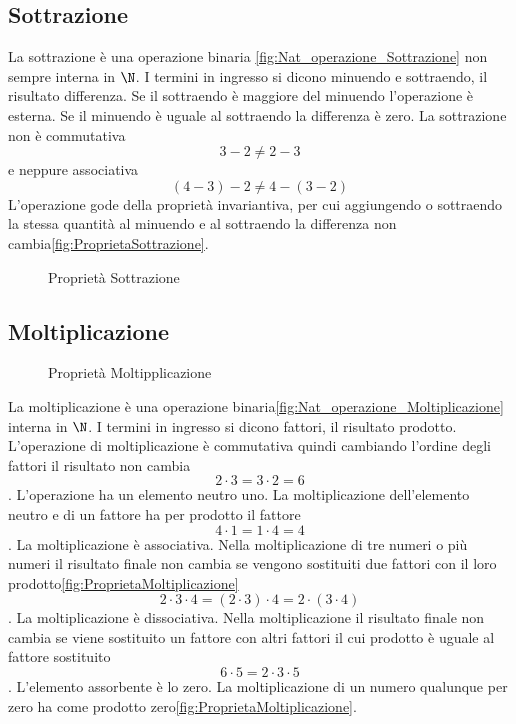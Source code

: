 \subsection{Sottrazione}
\label{sec:NumerinatDiff}
La sottrazione è una operazione binaria \nobs\vref{fig:Nat_operazione_Sottrazione} non sempre interna in $\N$. I termini in ingresso si dicono minuendo e sottraendo, il risultato differenza. Se il sottraendo è maggiore del minuendo l'operazione è esterna. Se il minuendo è uguale al sottraendo la differenza è zero. La sottrazione non è commutativa \[3-2\neq2-3\] e neppure associativa \[(4-3)-2\neq4-(3-2)\]
 L'operazione gode della proprietà invariantiva, per cui aggiungendo o sottraendo la stessa quantità al minuendo e al sottraendo la differenza non cambia\nobs\vref{fig:ProprietaSottrazione}.  
\begin{figure} %
	\centering

	\caption{Proprietà Sottrazione}
	\label{fig:ProprietaSottrazione}\end{figure}
\subsection{Moltiplicazione}
\label{sec:NumerinatMolt}
\begin{figure} %
	\centering

	\caption{Proprietà Moltipplicazione}
	\label{fig:ProprietaMoltiplicazione}\end{figure}
La moltiplicazione è una operazione binaria\nobs\vref{fig:Nat_operazione_Moltiplicazione}  interna in $\N$. I termini in ingresso si dicono fattori, il risultato prodotto. L'operazione di moltiplicazione  è commutativa quindi cambiando l'ordine degli fattori il risultato non cambia \[2\cdot3=3\cdot2=6\]. L'operazione ha un elemento neutro uno. La moltiplicazione dell'elemento neutro e di un fattore ha per prodotto il fattore  \[4\cdot1=1\cdot4=4\]. La moltiplicazione è associativa. Nella moltiplicazione di tre numeri o più numeri il risultato finale non cambia se vengono sostituiti due fattori con il loro prodotto\nobs\vref{fig:ProprietaMoltiplicazione} \[2\cdot3\cdot4=(2\cdot3)\cdot4=2\cdot(3\cdot4)\]. La moltiplicazione è dissociativa. Nella moltiplicazione  il risultato finale non cambia se viene sostituito un fattore con altri fattori il cui prodotto è uguale al fattore sostituito  \[6\cdot5=2\cdot3\cdot5\]. L'elemento assorbente è lo zero. La moltiplicazione di un numero qualunque per zero ha come prodotto zero\nobs\vref{fig:ProprietaMoltiplicazione}.
